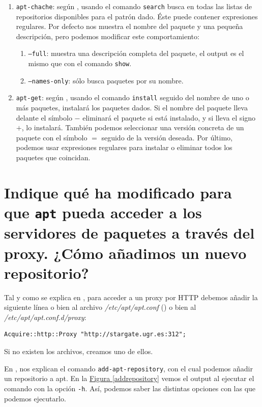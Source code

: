 \documentclass[10pt,a4paper,spanish]{article}
\numberwithin{equation}{section} %
\numberwithin{figure}{section} %
\numberwithin{table}{section} %
\begin{document}
\begin{enumerate}[---]
    \item \texttt{apt-chache}: según \cite{manaptchache}, usando el comando \texttt{search} busca en todas las listas de repositorios disponibles para el patrón dado. Éste puede contener expresiones regulares. Por defecto nos muestra el nombre del paquete y una pequeña descripción, pero podemos modificar este comportamiento:
    \begin{enumerate}[$\bullet$]
        \item \texttt{--full}: muestra una descripción completa del paquete, el output es el mismo que con el comando \texttt{show}.
        \item \texttt{--names-only}: sólo busca paquetes por su nombre.
    \end{enumerate}

    \item \texttt{apt-get}: según \cite{manaptget}, usando el comando \texttt{install} seguido del nombre de uno o más paquetes, instalará los paquetes dados. Si el nombre del paquete lleva delante el símbolo $-$ eliminará el paquete si está instalado, y si lleva el signo $+$, lo instalará. También podemos seleccionar una versión concreta de un paquete con el símbolo $=$ seguido de la versión deseada. Por último, podemos usar expresiones regulares para instalar o eliminar todos los paquetes que coincidan.
\end{enumerate}

\section{Indique qué ha modificado para que \texttt{apt} pueda acceder a los servidores de paquetes a través del proxy. ¿Cómo añadimos un nuevo repositorio?}
Tal y como se explica en \cite{aptproxy}, para acceder a un proxy por HTTP debemos añadir la siguiente línea o bien al archivo \textit{/etc/apt/apt.conf} (\cite{manaptconf}) o bien al \textit{/etc/apt/apt.conf.d/proxy}:

\begin{verbatim}
Acquire::http::Proxy "http://stargate.ugr.es:312";
\end{verbatim}

Si no existen los archivos, creamos uno de ellos.

En \cite{addrepoubu}, nos explican el comando \texttt{add-apt-repository}, con el cual podemos añadir un repositorio a apt. En la \hyperref[addrepository]{Figura \ref*{addrepository}} vemos el output al ejecutar el comando con la opción \texttt{-h}. Así, podemos saber las distintas opciones con las que podemos ejecutarlo.
\end{document}
